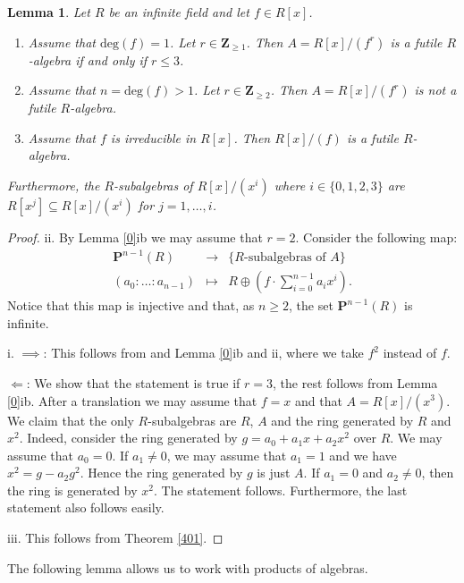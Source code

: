 \documentclass{amsart}
\theoremstyle{plain}
\newtheorem{lemma}[theorem]{Lemma}
\theoremstyle{definition}
\begin{document}
\begin{lemma} \label{4}
Let $R$ be an infinite field and let $f \in R[x]$. 
\begin{enumerate}
 \item Assume that $\mathrm{deg}(f)=1$. Let $r \in {\mathbf{Z}}_{\geq 1}$. Then $A=R[x]/(f^r)$ is a futile $R$-algebra if and only if $r \leq 3$. 
 \item Assume that $n=\mathrm{deg}(f)>1$. Let $r \in {\mathbf{Z}}_{\geq 2}$. Then $A=R[x]/(f^r)$ is not a futile $R$-algebra.
 \item Assume that $f$ is irreducible in $R[x]$. Then $R[x]/(f)$ is a futile $R$-algebra.  
\end{enumerate}
Furthermore, the $R$-subalgebras of $R[x]/(x^i)$ where $i \in \{0,1,2,3\}$ are $R[x^j] \subseteq R[x]/(x^i)$ for $j=1,\ldots,i$. 
\end{lemma}
\begin{proof}
 ii. By Lemma \ref{0}ib we may assume that $r=2$. Consider the following
map:
\begin{eqnarray*}
 {\mathbf{P}}^{n-1}(R) &\to& \{R\textrm{-subalgebras of }A \} \\
(a_0:\ldots:a_{n-1}) &\mapsto& R \oplus (f \cdot \sum_{i=0}^{n-1} a_i x^i).
\end{eqnarray*}
Notice that this map is injective and that, as $n \geq 2$, the set ${\mathbf{P}}^{n-1}(R)$ is infinite.

 i. $\implies$: This follows from and Lemma \ref{0}ib and ii, where we take $f^2$ instead of $f$.

${\Longleftarrow}$: We show that the statement is true if $r=3$, the rest follows from Lemma \ref{0}ib. After a translation we may assume that $f=x$ and that
$A=R[x]/(x^3)$. We claim that the only $R$-subalgebras are $R$, $A$ and the ring generated by $R$ and $x^2$. Indeed, consider the ring
generated by $g=a_0+a_1x+a_2x^2$ over $R$. We may assume that $a_0=0$. If $a_1 \neq 0$, we may assume that $a_1=1$ and we have $x^2=g-a_2g^2$. Hence the ring generated by $g$
is just $A$. If $a_1=0$ and $a_2 \neq 0$, then the ring is generated by $x^2$. The statement follows. Furthermore, the last statement also follows easily.

iii. This follows from Theorem \ref{401}.

\end{proof}

The following lemma allows us to work with products of algebras.
\end{document}
